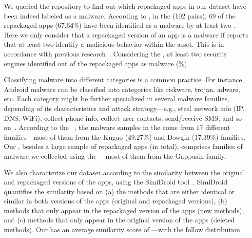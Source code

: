 We queried the \vt repository to find out which repackaged apps in our
dataset have been indeed labeled as a malware.
According to \vt, in the \sds (102 pairs),
69 of the repackaged apps (67.64\%) have been identified as a malware by at least two
\ses. Here we only consider that a repackaged version of an app is a malware if \vt reports that at least
two \ses identify a malicious behavior within the asset. This is in accordance with previous research~\cite{vt-label,DBLP:journals/ese/KhanmohammadiEH19}. Considering the \cds, at least two security engines identified \malwares out of the \apps repackaged apps as malware (\malwaresP\%).

Classifying malware into different categories is a common practice. For instance, Android malware can be classified into categories
like riskware, trojan, adware, etc. Each category might be further specialized in several malware families, depending of its
characteristics and attack strategy---e.g., steal network info (IP, DNS, WiFi), collect phone info,
collect user contacts, send/receive SMS, and so on~\cite{DBLP:conf/iccns/RahaliLKTGM20}.
According to the
\avt~\cite{avclass2-paper}, the malware samples in the \sds come from $17$ different families---most of them from the Kuguo (49.27\%) and Dowgin (17.39\%) families.  
Our \cds, besides a large sample of repackaged apps (\apps in total),
comprises  families of malware we collected using the \avt---most
of them from the Gappusin  family.

We also characterize our dataset according to the similarity
between the original and repackaged versions of the apps, using the  
SimiDroid tool~\cite{DBLP:conf/trustcom/0029BK17}. SimiDroid quantifies the similarity
based on (a) the methods that are either identical or similar in both versions of the apps (original and repackaged versions),
(b) methods that only appear in the repackaged version of the apps (new methods), and (c) methods that only appear in the
original version of the apps (deleted methods).
Our \cds has an average similarity score of ---with the follow distribution 


